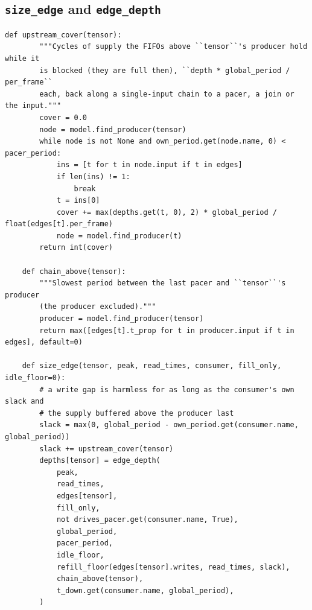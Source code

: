 \documentclass[10pt,a4paper]{article}
\newcommand{\code}[1]{\texttt{#1}}
\begin{document}
\subsection{\code{size\_edge} and \code{edge\_depth}}

\begin{lstlisting}[firstnumber=894,title={\texttt{src/finn/transformation/fpgadataflow/derive\_characteristic.py}, lines 894--932}]
    def upstream_cover(tensor):
        """Cycles of supply the FIFOs above ``tensor``'s producer hold while it
        is blocked (they are full then), ``depth * global_period / per_frame``
        each, back along a single-input chain to a pacer, a join or the input."""
        cover = 0.0
        node = model.find_producer(tensor)
        while node is not None and own_period.get(node.name, 0) < pacer_period:
            ins = [t for t in node.input if t in edges]
            if len(ins) != 1:
                break
            t = ins[0]
            cover += max(depths.get(t, 0), 2) * global_period / float(edges[t].per_frame)
            node = model.find_producer(t)
        return int(cover)

    def chain_above(tensor):
        """Slowest period between the last pacer and ``tensor``'s producer
        (the producer excluded)."""
        producer = model.find_producer(tensor)
        return max([edges[t].t_prop for t in producer.input if t in edges], default=0)

    def size_edge(tensor, peak, read_times, consumer, fill_only, idle_floor=0):
        # a write gap is harmless for as long as the consumer's own slack and
        # the supply buffered above the producer last
        slack = max(0, global_period - own_period.get(consumer.name, global_period))
        slack += upstream_cover(tensor)
        depths[tensor] = edge_depth(
            peak,
            read_times,
            edges[tensor],
            fill_only,
            not drives_pacer.get(consumer.name, True),
            global_period,
            pacer_period,
            idle_floor,
            refill_floor(edges[tensor].writes, read_times, slack),
            chain_above(tensor),
            t_down.get(consumer.name, global_period),
        )
\end{lstlisting}
\end{document}
